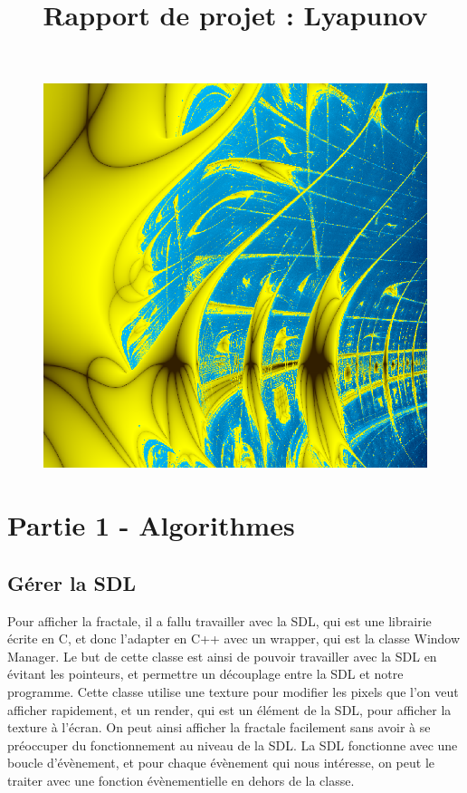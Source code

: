 \documentclass{article}
\title{Rapport de projet : Lyapunov}
\date{}
\begin{document}
    \vspace*{-2pt}
    {\let\newpage\relax\maketitle} \thispagestyle{fancy}

    \vspace{-2cm}
\begin{figure}[!h]
    \center
    \includegraphics[scale = 0.3]{zircon}
\end{figure}
\section* {Partie 1 - Algorithmes}
    \subsection*{Gérer la SDL}
    Pour afficher la fractale, il a fallu travailler avec la SDL, qui est une librairie écrite en C, et donc l'adapter en C++ avec un wrapper, qui est la classe Window Manager.
    Le but de cette classe est ainsi de pouvoir travailler avec la SDL en évitant les pointeurs, et permettre un découplage entre la SDL et notre programme.
    Cette classe utilise une texture pour modifier les pixels que l'on veut afficher rapidement, et un render, qui est un élément de la SDL, pour afficher la texture à l'écran.
    On peut ainsi afficher la fractale facilement sans avoir à se préoccuper du fonctionnement au niveau de la SDL.
    La SDL fonctionne avec une boucle d'évènement, et pour chaque évènement qui nous intéresse, on peut le traiter avec une fonction évènementielle en dehors de la classe.
\end{document}

